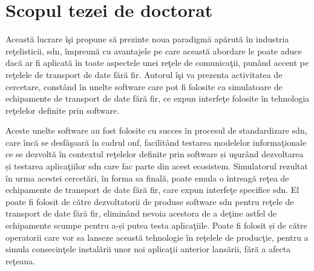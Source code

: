\section{Scopul tezei de doctorat}

Această lucrare îşi propune să prezinte noua paradigmă apărută în industria reţelisticii, \gls{sdn}, împreună cu avantajele pe care această abordare le poate aduce dacă ar fi aplicată în toate aspectele unei reţele de comunicaţii, punând accent pe reţelele de transport de date fără fir. Autorul îşi va prezenta activitatea de cercetare, constând în unelte software care pot fi folosite ca simulatoare de echipamente de transport de date fără fir, ce expun interfeţe folosite în tehnologia reţelelor definite prin software.

Aceste unelte software au fost folosite cu succes în procesul de standardizare \gls{sdn}, care încă se desfăşoară în cadrul \gls{onf}, facilitând testarea modelelor informaţionale ce se dezvoltă în contextul reţelelor definite prin software și uşurând dezvoltarea și testarea aplicaţiilor \gls{sdn} care fac parte din acest ecosistem. Simulatorul rezultat în urma acestei cercetări, în forma sa finală, poate emula o întreagă reţea de echipamente de transport de date fără fir, care expun interfeţe specifice \gls{sdn}. El poate fi folosit de către dezvoltatorii de produse software \gls{sdn} pentru reţele de transport de date fără fir, eliminând nevoia acestora de a deţine astfel de echipamente scumpe pentru a-și putea testa aplicaţiile. Poate fi folosit și de către operatorii care vor sa lanseze această tehnologie în reţelele de producţie, pentru a simula consecinţele instalării unor noi aplicaţii anterior lansării, fără a afecta reţeaua.